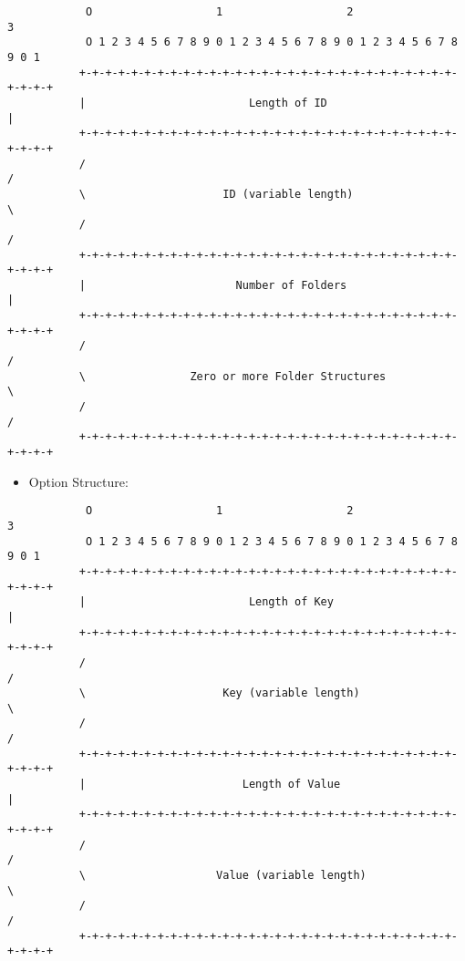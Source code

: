 \begin{verbatim}
            O                   1                   2                   3
            O 1 2 3 4 5 6 7 8 9 0 1 2 3 4 5 6 7 8 9 0 1 2 3 4 5 6 7 8 9 0 1
           +-+-+-+-+-+-+-+-+-+-+-+-+-+-+-+-+-+-+-+-+-+-+-+-+-+-+-+-+-+-+-+-+
           |                         Length of ID                          |
           +-+-+-+-+-+-+-+-+-+-+-+-+-+-+-+-+-+-+-+-+-+-+-+-+-+-+-+-+-+-+-+-+
           /                                                               /
           \                     ID (variable length)                      \
           /                                                               /
           +-+-+-+-+-+-+-+-+-+-+-+-+-+-+-+-+-+-+-+-+-+-+-+-+-+-+-+-+-+-+-+-+
           |                       Number of Folders                       |
           +-+-+-+-+-+-+-+-+-+-+-+-+-+-+-+-+-+-+-+-+-+-+-+-+-+-+-+-+-+-+-+-+
           /                                                               /
           \                Zero or more Folder Structures                 \
           /                                                               /
           +-+-+-+-+-+-+-+-+-+-+-+-+-+-+-+-+-+-+-+-+-+-+-+-+-+-+-+-+-+-+-+-+
\end{verbatim}

\begin{itemize}
 \item Option Structure:
\end{itemize}

\begin{verbatim}
            O                   1                   2                   3
            O 1 2 3 4 5 6 7 8 9 0 1 2 3 4 5 6 7 8 9 0 1 2 3 4 5 6 7 8 9 0 1
           +-+-+-+-+-+-+-+-+-+-+-+-+-+-+-+-+-+-+-+-+-+-+-+-+-+-+-+-+-+-+-+-+
           |                         Length of Key                         |
           +-+-+-+-+-+-+-+-+-+-+-+-+-+-+-+-+-+-+-+-+-+-+-+-+-+-+-+-+-+-+-+-+
           /                                                               /
           \                     Key (variable length)                     \
           /                                                               /
           +-+-+-+-+-+-+-+-+-+-+-+-+-+-+-+-+-+-+-+-+-+-+-+-+-+-+-+-+-+-+-+-+
           |                        Length of Value                        |
           +-+-+-+-+-+-+-+-+-+-+-+-+-+-+-+-+-+-+-+-+-+-+-+-+-+-+-+-+-+-+-+-+
           /                                                               /
           \                    Value (variable length)                    \
           /                                                               /
           +-+-+-+-+-+-+-+-+-+-+-+-+-+-+-+-+-+-+-+-+-+-+-+-+-+-+-+-+-+-+-+-+
\end{verbatim}

